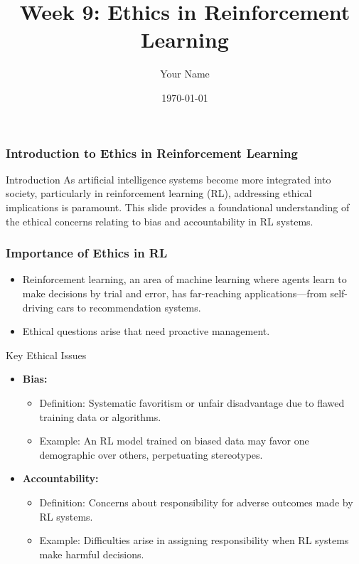 \documentclass{beamer}
\title{Week 9: Ethics in Reinforcement Learning}
\author{Your Name}
\institute{Your Institution}
\date{\today}
\begin{document}
\frame{\titlepage}

\begin{frame}[fragile]
    \titlepage
\end{frame}

\begin{frame}[fragile]
    \frametitle{Introduction to Ethics in Reinforcement Learning}
    \begin{block}{Introduction}
        As artificial intelligence systems become more integrated into society, particularly in reinforcement learning (RL), addressing ethical implications is paramount. This slide provides a foundational understanding of the ethical concerns relating to bias and accountability in RL systems.
    \end{block}
\end{frame}

\begin{frame}[fragile]
    \frametitle{Importance of Ethics in RL}
    \begin{itemize}
        \item Reinforcement learning, an area of machine learning where agents learn to make decisions by trial and error, has far-reaching applications—from self-driving cars to recommendation systems.
        \item Ethical questions arise that need proactive management.
    \end{itemize}
    \begin{block}{Key Ethical Issues}
        \begin{itemize}
            \item \textbf{Bias:}
            \begin{itemize}
                \item Definition: Systematic favoritism or unfair disadvantage due to flawed training data or algorithms.
                \item Example: An RL model trained on biased data may favor one demographic over others, perpetuating stereotypes.
            \end{itemize}
            \item \textbf{Accountability:}
            \begin{itemize}
                \item Definition: Concerns about responsibility for adverse outcomes made by RL systems.
                \item Example: Difficulties arise in assigning responsibility when RL systems make harmful decisions.
            \end{itemize}
        \end{itemize}
    \end{block}
\end{frame}
\end{document}
